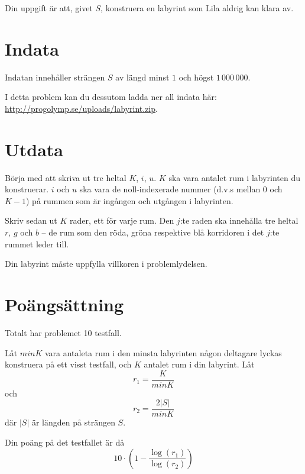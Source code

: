 Din uppgift är att, givet $S$, konstruera en labyrint som Lila aldrig kan klara av.

\section*{Indata}
Indatan innehåller strängen $S$ av längd minst $1$ och högst $1\,000\,000$.

I detta problem kan du dessutom ladda ner all indata här: \url{http://progolymp.se/uploads/labyrint.zip}.

\section*{Utdata}
Börja med att skriva ut tre heltal $K$, $i$, $u$.
$K$ ska vara antalet rum i labyrinten du konstruerar.
$i$ och $u$ ska vara de noll-indexerade nummer (d.v.s mellan $0$ och $K - 1$) på rummen som är ingången och utgången i labyrinten.

Skriv sedan ut $K$ rader, ett för varje rum.
Den $j$:te raden ska innehålla tre heltal $r$, $g$ och $b$ -- de rum som den röda, gröna respektive blå korridoren i det $j$:te rummet leder till.

Din labyrint måste uppfylla villkoren i problemlydelsen.

\section*{Poängsättning}
Totalt har problemet 10 testfall.

Låt $minK$ vara antaleta rum i den minsta labyrinten någon deltagare lyckas konstruera på ett visst testfall, och $K$ antalet rum i din labyrint.
Låt
$$r_1 = \frac{K}{minK}$$
och
$$r_2 = \frac{2|S|}{minK}$$
där $|S|$ är längden på strängen $S$.

Din poäng på det testfallet är då
$$10 \cdot \left(1 - \frac{\log(r_1)}{\log(r_2)}\right)$$
